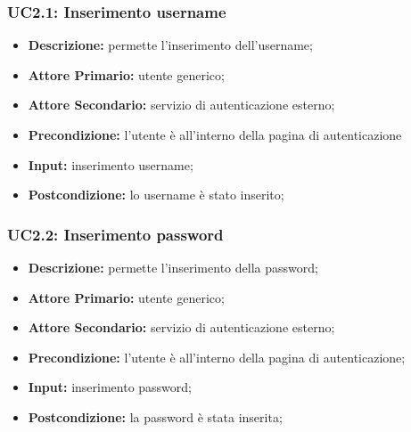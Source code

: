 \subsubsection{UC2.1: Inserimento username}
\label{sec:UC2.1}
\begin{itemize}
    \item \textbf{Descrizione:} permette l'inserimento dell'username;
    \item \textbf{Attore Primario:} utente generico;
    \item \textbf{Attore Secondario:} servizio di autenticazione esterno;
    \item \textbf{Precondizione:} l'utente è all'interno della pagina di autenticazione
    \item \textbf{Input:} inserimento username;
    \item \textbf{Postcondizione:} lo username è stato inserito;
\end{itemize}
\subsubsection{UC2.2: Inserimento password}
\label{sec:UC2.2}
\begin{itemize}
    \item \textbf{Descrizione:} permette l'inserimento della password;
    \item \textbf{Attore Primario:} utente generico;
    \item \textbf{Attore Secondario:} servizio di autenticazione esterno;
    \item \textbf{Precondizione:} l'utente è all'interno della pagina di autenticazione;
    \item \textbf{Input:} inserimento password;
    \item \textbf{Postcondizione:} la password è stata inserita;
\end{itemize}

